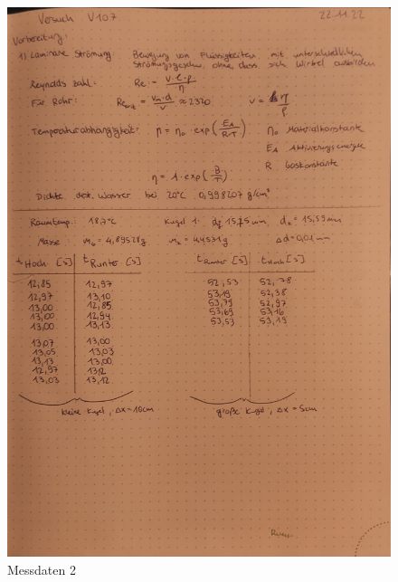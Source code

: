 \begin{figure}[H]
    \centering
    \includegraphics[width=1\textwidth]{content/Messdaten2.jpeg}
    \caption{Messdaten 2}
    \label{fig:plot}
\end{figure}